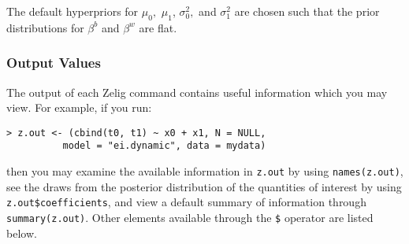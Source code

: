 \begin{itemize}
The default hyperpriors for $\mu_{0},$ $\mu_{1}$, $\sigma_{0}^{2},$
and $\sigma_{1}^{2}$ are chosen such that the prior distributions for
$\beta^b$ and $\beta^w$ are flat.

\end{itemize}

\subsubsection{Output Values}

The output of each Zelig command contains useful information which you may
view. For example, if you run:
\begin{verbatim}
> z.out <- (cbind(t0, t1) ~ x0 + x1, N = NULL, 
          model = "ei.dynamic", data = mydata)
\end{verbatim}

\noindent then you may examine the available information in 
\texttt{z.out} by using \texttt{names(z.out)}, see the draws from the
posterior distribution of the quantities of interest by using
\texttt{z.out\$coefficients}, and view a default summary of
information through \texttt{summary(z.out)}. Other elements available
through the \texttt{\$} operator are listed below.

